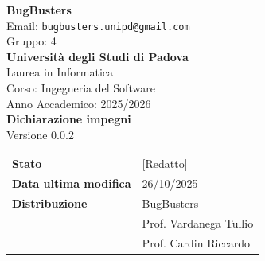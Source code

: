 \documentclass[a4paper,11pt]{article}
\newcommand{\CurrentVersion}{0.0.2}
\begin{document}
\begin{center}  
  
  {\Large\bfseries\color{primaryblue} BugBusters}\\[0.3cm]
  {\small\color{darkgray} Email: \texttt{bugbusters.unipd@gmail.com}} \\[0.1cm]
  {\small\color{darkgray} Gruppo: 4} \\[0.5cm]

  {\large\bfseries Università degli Studi di Padova}\\[0.3cm]
  {\small Laurea in Informatica}\\[0.2cm]
  {\small Corso: Ingegneria del Software}\\[0.2cm]
  {\small Anno Accademico: 2025/2026}\\[0.8cm]

  {\Huge\bfseries\color{primaryblue} Dichiarazione impegni}\\[0.3cm]
  {\Large Versione \CurrentVersion}\\[0.8cm]
\end{center}

\begin{center}
\begin{tcolorbox}[colback=lightgray,colframe=primaryblue,width=0.85\textwidth,arc=3mm,boxrule=0.5pt]
\begin{tabular}{@{}ll@{}}
\textbf{Stato} & [Redatto] \\
\textbf{Data ultima modifica} & 26/10/2025 \\
\textbf{Distribuzione} & BugBusters \\
 & Prof. Vardanega Tullio \\
 & Prof. Cardin Riccardo \\
\end{tabular}
\end{tcolorbox}
\end{center}
\end{document}
